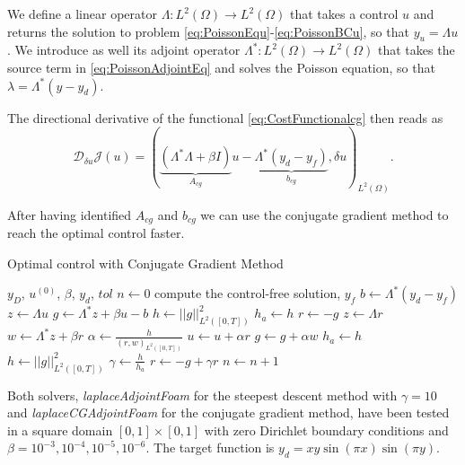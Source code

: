 \documentclass[10pt,a4paper]{article}
\begin{document}
We define a linear operator $\Lambda: L^2\left( \Omega \right) \rightarrow L^2\left( \Omega \right)$ that takes a control $u$ and returns the solution to problem \eqref{eq:PoissonEqu}-\eqref{eq:PoissonBCu}, so that $y_u = \Lambda u$. We introduce as well its adjoint operator $\Lambda^*: L^2\left( \Omega \right) \rightarrow L^2\left( \Omega \right)$ that takes the source term in \eqref{eq:PoissonAdjointEq} and solves the Poisson equation, so that $\lambda = \Lambda^* \left( y - y_d \right)$.

The directional derivative of the functional \eqref{eq:CostFunctionalcg} then reads as
%
\begin{equation}
\mathcal{D}_{\delta u} \mathcal{J}\left( u \right) = \left( \underbrace{ \left(  \Lambda^* \Lambda + \beta I  \right)}_{A_{cg}} u - \underbrace{ \Lambda^* \left( y_d - y_f \right)}_{b_{cg}}, \delta u \right) _{L^2\left( \Omega \right)}.
\end{equation}

After having identified $A_{cg}$ and $b_{cg}$ we can use the conjugate gradient method to reach the optimal control faster. 

\begin{algorithm}[h]
\caption{Optimal control with Conjugate Gradient Method}\label{CGalgorithm}
\begin{algorithmic}[1]
\Require $y_D$, $u^{\left(0\right)}$, $\beta$, $y_d$, $tol$
\State $n \gets 0 $
\State compute the control-free solution, $y_f$
\State $b \gets \Lambda^*\left( y_d - y_f \right)$
\State $z \gets \Lambda u$
\State $g \gets \Lambda^*z + \beta u - b$
\State $h \gets ||g||^2_{L^2\left(\left[0,T\right]\right)}$
\State $h_a \gets h$
\State $r \gets -g$
\State $z \gets \Lambda r$
\State $w \gets \Lambda^*z + \beta r$
\State $\alpha \gets \frac{h}{\left(r,w\right)_{L^2\left(\left[0,T\right]\right)}}$
\State $u \gets u + \alpha r$
\State $g \gets g + \alpha w$
\State $h_a \gets h$
\State $h \gets ||g||^2_{L^2\left(\left[0,T\right]\right)}$
\State $\gamma \gets \frac{h}{h_a}$
\State $r \gets -g + \gamma r$
\State $n \gets n + 1$
\EndWhile

\end{algorithmic}
\end{algorithm}



Both solvers, \textit{laplaceAdjointFoam} for the steepest descent method with $\gamma = 10$ and \textit{laplaceCGAdjointFoam} for the conjugate gradient method, have been tested in a square domain $[0, 1] \times [0, 1]$ with zero Dirichlet boundary conditions and $\beta = 10^{-3},10^{-4},10^{-5},10^{-6}$. The target function is $y_d = xy \sin \left( \pi x \right) \sin \left( \pi y \right)$. 
\end{document}
